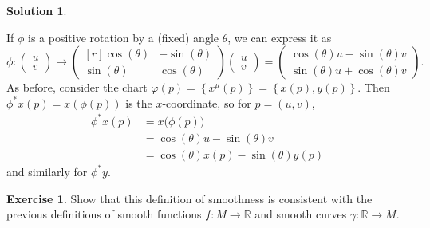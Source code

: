 \documentclass[11pt, a4paper]{report}
\theoremstyle{definition}
\newtheorem{ex}{Exercise}[part]
\newtheorem{sol}{Solution}[part]
\begin{document}
\begin{sol}\label{sol:pullbackrotation}

If $\phi$ is a positive rotation by a (fixed) angle $\theta$, we can express it as
\[
    \phi: \begin{pmatrix}
            u \\ v
        \end{pmatrix}
        \mapsto
        \begin{pmatrix*}[r]
            \cos(\theta) & -\sin(\theta) \\
            \sin(\theta) & \cos(\theta)
        \end{pmatrix*}
        \begin{pmatrix}
            u \\ v
        \end{pmatrix}
        =
        \begin{pmatrix}
            \cos(\theta) u - \sin(\theta) v \\
            \sin(\theta) u + \cos(\theta) v
        \end{pmatrix}.
\]
As before, consider the chart $\varphi(p) = \left\{x^\mu(p)\right\} = \left\{x(p), y(p)\right\}$.
Then $\phi^* x(p) = x(\phi(p))$ is the $x$-coordinate, so for $p = (u, v)$,
\begin{align*}
    \phi^* x(p) &= x \bigl( \phi(p) \bigr) \\
                &= \cos(\theta) u - \sin(\theta) v \\
                &= \cos(\theta) x(p) - \sin(\theta) y(p)
\end{align*}
and similarly for $\phi^* y$.

\end{sol}

\begin{ex}

Show that this definition of smoothness is consistent with the previous definitions of smooth functions $f: M \to \mathbb{R}$ and smooth curves $\gamma: \mathbb{R} \to M$.

\end{ex}
\end{document}
